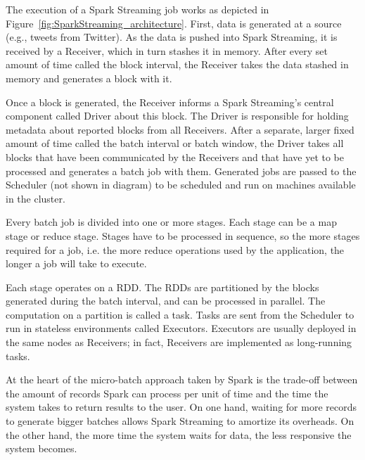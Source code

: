 The execution of a Spark Streaming job works as depicted in Figure~\ref{fig:SparkStreaming_architecture}. 
First, data is generated at a source (e.g., tweets from Twitter). As the data is pushed into Spark Streaming, it is received by a Receiver, which in turn stashes it in memory. After every set amount of time called the block interval, the Receiver takes the data stashed in memory and generates a block with it.

Once a block is generated, the Receiver informs a Spark Streaming's central component called Driver about this block. The Driver is responsible for holding metadata about reported blocks from all Receivers.
After a separate, larger fixed amount of time called the batch interval or batch window, the Driver takes all blocks that have been communicated by the Receivers and that have yet to be processed and generates a batch job with them. Generated jobs are passed to the Scheduler (not shown in diagram) to be scheduled and run on machines available in the cluster.

Every batch job is divided into one or more stages. Each stage can be a map stage or reduce stage. Stages have to be processed in sequence, so the more stages required for a job, i.e. the more reduce operations used by the application, the longer a job will take to execute.

Each stage operates on a RDD. The RDDs are partitioned by the blocks generated during the batch interval, and can be processed in parallel. The computation on a partition is called a task. Tasks are sent from the Scheduler to run in stateless environments called Executors. Executors are usually deployed in the same nodes as Receivers; in fact, Receivers are implemented as long-running tasks.

At the heart of the micro-batch approach taken by Spark is the trade-off between the amount of records Spark can process per unit of time and the time the system takes to return results to the user.
On one hand, waiting for more records to generate bigger batches allows Spark Streaming to amortize its overheads. On the other hand, the more time the system waits for data, the less responsive the system becomes.


